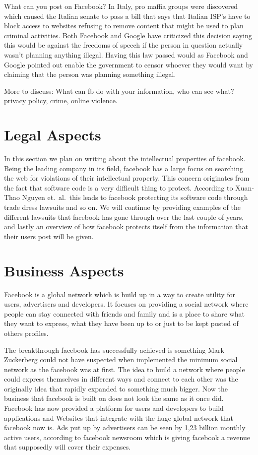 \documentclass[conference]{IEEEtran}
\begin{document}
What can you post on Facebook?
In Italy, pro maffia groups were discovered which caused the Italian senate to
pass a bill that says that Italian ISP’s have to block access to websites
refusing to remove content that might be used to plan criminal activities. Both
Facebook and Google have criticized this decision saying this would be against
the freedoms of speech if the person in question actually wasn't planning
anything illegal.  Having this law passed would as Facebook and Google pointed
out enable the government to censor whoever they would want by claiming that
the person was planning something illegal. 

More to discuss:
What can fb do with your information, who can see what? privacy policy, crime,
online violence.

\section{Legal Aspects}
\label{legal}
In this section we plan on writing about the intellectual properties of
facebook. Being the leading company in its field, facebook has a large focus on
searching the web for violations of their intellectual property. This concern
originates from the fact that software code is a very difficult thing to
protect. According to  Xuan-Thao Nguyen et.\ al.\ this leads to facebook
protecting its software code through trade dress lawsuits and so on. We will
continue by providing examples of the different lawsuits that facebook has gone
through over the last couple of years, and lastly an overview of how facebook
protects itself from the information that their users post will be given.

\section{Business Aspects}
\label{financial}
Facebook is a global network which is build up in a way to create utility for
users, advertisers and developers. It focuses on providing a social network
where people can stay connected with friends and family and is a place to share
what they want to express, what they have been up to or just to be kept posted
of others profiles. 

The breakthrough facebook has successfully achieved is something Mark
Zuckerberg could not have suspected when implemented the minimum social network
as the facebook was at first. The idea to build a network where people could
express themselves in different ways and connect to each other was the
originally idea that rapidly expanded to something much bigger. Now the
business that facebook is built on does not look the same as it once did.
Facebook has now provided a platform for users and developers to build
applications and Websites that integrate with the huge global network that
facebook now is. Ads put up by advertisers can be seen by 1,23 billion monthly
active users, according to facebook newsroom which is giving facebook a revenue
that supposedly will cover their expenses.
\end{document}

